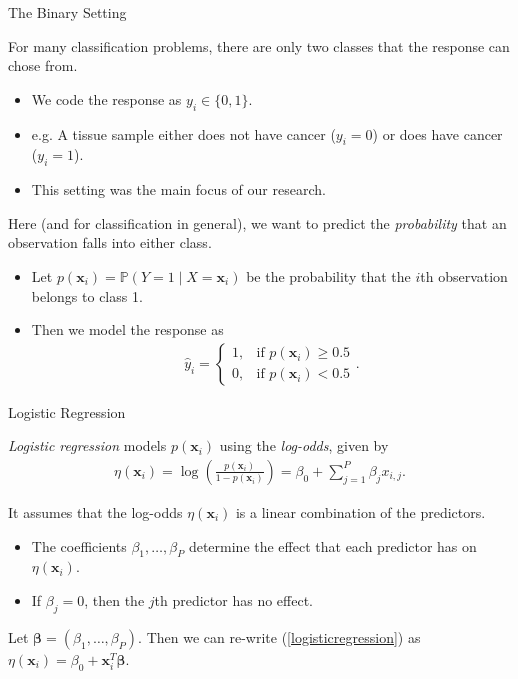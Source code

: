 \documentclass[8pt]{beamer}
\newcommand{\mys}{\vspace{0.5cm} %
}
\newcommand{\mysa}{\vspace{0.2cm} %
}
\begin{document}
\begin{frame}{\color{white} The Binary Setting}

For many classification problems, there are only two classes that the response can chose from.
\begin{itemize}
    \item We code the response as $y_i \in \{ 0,1 \}$.
    \item e.g. A tissue sample either does not have cancer ($y_i = 0$) or does have cancer ($y_i = 1$).
    \item This setting was the main focus of our research. 
\end{itemize} \mys 

Here (and for classification in general), we want to predict the \textit{probability} that an observation falls into either class.
\begin{itemize}
    \item Let $p(\bm{x}_i) = \mathbb{P}(Y = 1 \mid X = \bm{x}_i)$ be the probability that the $i$th observation belongs to class 1.
    \item Then we model the response as 
    \begin{align*}
        \hat{y}_i = \begin{cases}
        1, & \text{if } p(\bm{x}_i) \ge 0.5 \\
        0, & \text{if } p(\bm{x}_i) < 0.5
        \end{cases}.
    \end{align*}
\end{itemize}
    
\end{frame}

\begin{frame}{Logistic Regression}

\textit{Logistic regression} models $p(\bm{x}_i)$ using the \textit{log-odds}, given by
\begin{align}
    \label{logisticregression}
    \eta(\bm{x}_i) = \log \left( \frac{p(\bm{x}_i)}{1 - p(\bm{x}_i)} \right) = \beta_0 + \sum_{j=1}^P \beta_j x_{i, j}.
\end{align} \mysa

It assumes that the log-odds $\eta(\bm{x}_i)$ is a linear combination of the predictors.
\begin{itemize}
    \item The coefficients $\beta_1, \ldots, \beta_P$ determine the effect that each predictor has on $\eta(\bm{x}_i)$.
    \item If $\beta_j = 0$, then the $j$th predictor has no effect.
\end{itemize} \mys

Let $\bm{\beta} = (\beta_1, \ldots, \beta_P)$. Then we can re-write (\ref{logisticregression}) as $\eta(\bm{x}_i) = \beta_0 + \bm{x}_i^T \bm{\beta}$.

    
\end{frame}
\end{document}

